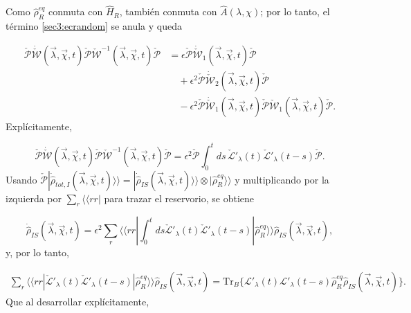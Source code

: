 \begin{appendixs}
Como \(\hat{\rho}_{R}^{eq}\) conmuta con \(\hat{H}_{R}\), también conmuta con \(\hat{A}(\lambda,\chi)\); por lo tanto, el término \eqref{sec3:ecrandom} se anula y queda

\begin{align*}
\check{\mathcal{P}}\dot{\check{\mathcal{W}}}(\vec{\lambda},\vec{\chi},t)\check{\mathcal{P}}\check{\mathcal{W}}^{-1}(\vec{\lambda},\vec{\chi},t)\check{\mathcal{P}} &= \epsilon \check{\mathcal{P}}\dot{\check{\mathcal{W}}}_{1}(\vec{\lambda},\vec{\chi},t)\check{\mathcal{P}} \\
&\quad + \epsilon^{2}\check{\mathcal{P}}\dot{\check{\mathcal{W}}}_{2}(\vec{\lambda},\vec{\chi},t)\check{\mathcal{P}} \\
&\quad - \epsilon^{2}\check{\mathcal{P}}\dot{\check{\mathcal{W}}}_{1}(\vec{\lambda},\vec{\chi},t)\check{\mathcal{P}}  \check{\mathcal{W}}_{1}(\vec{\lambda},\vec{\chi},t) \check{\mathcal{P}} .
\end{align*}
Explícitamente,

\begin{equation*}
\check{\mathcal{P}}\dot{\check{\mathcal{W}}}(\vec{\lambda},\vec{\chi},t)\check{\mathcal{P}}\check{\mathcal{W}}^{-1}(\vec{\lambda},\vec{\chi},t)\check{\mathcal{P}} = \epsilon^{2}\check{\mathcal{P}}\int_{0}^{t}ds\, \check{\mathcal{L}}'_{\lambda}(t)\check{\mathcal{L}}'_{\lambda}(t-s)\check{\mathcal{P}} .
\end{equation*}
Usando \(\check{\mathcal{P}}|\dot{\hat{\rho}}_{tot,I}(\vec{\lambda},\vec{\chi},t)\rangle\rangle = |\dot{\hat{\rho}}_{IS}(\vec{\lambda},\vec{\chi},t)\rangle\rangle \otimes |\hat{\rho}_{R}^{eq}\rangle\rangle\) y multiplicando por la izquierda por \(\sum_{r}\langle\langle rr|\) para trazar el reservorio, se obtiene

\begin{equation*}
\dot{\hat{\rho}}_{IS}(\vec{\lambda},\vec{\chi},t) = \epsilon^{2} \sum_{r}\langle \langle rr|\int_{0}^{t}ds \check{\mathcal{L}}'_{\lambda}(t)\check{\mathcal{L}}'_{\lambda}(t-s)|\hat{\rho}_{R}^{eq}\rangle \rangle \hat{\rho}_{IS}(\vec{\lambda},\vec{\chi},t),
\end{equation*}
y, por lo tanto,

\begin{align*}
\sum_{r}\langle \langle rr| \check{\mathcal{L}}'_{\lambda}(t)\check{\mathcal{L}}'_{\lambda}(t-s)|\hat{\rho}_{R}^{eq}\rangle \rangle \hat{\rho}_{IS}(\vec{\lambda},\vec{\chi},t)
= \text{Tr}_{B}\big\{\mathcal{L}'_{\lambda}(t)\mathcal{L}'_{\lambda}(t-s)\hat{\rho}_{R}^{eq}\hat{\rho}_{IS}(\vec{\lambda},\vec{\chi},t) \big\}.
\end{align*}
Que al desarrollar explícitamente,


\end{appendixs}

